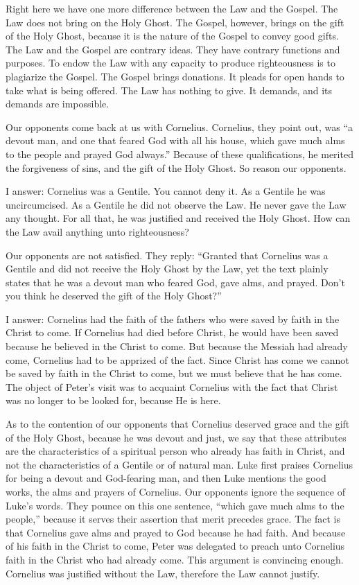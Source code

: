 Right here we have one more difference between the Law and the Gospel. The Law does not bring on the Holy Ghost. The Gospel, however, brings on the gift of the Holy Ghost, because it is the nature of the Gospel to convey good gifts. The Law and the Gospel are contrary ideas. They have contrary functions and purposes. To endow the Law with any capacity to produce righteousness is to plagiarize the Gospel. The Gospel brings donations. It pleads for open hands to take what is being offered. The Law has nothing to give. It demands, and its demands are impossible.

Our opponents come back at us with Cornelius. Cornelius, they point out, was “a devout man, and one that feared God with all his house, which gave much alms to the people and prayed God always.” Because of these qualifications, he merited the forgiveness of sins, and the gift of the Holy Ghost. So reason our opponents.

I answer: Cornelius was a Gentile. You cannot deny it. As a Gentile he was uncircumcised. As a Gentile he did not observe the Law. He never gave the Law any thought. For all that, he was justified and received the Holy Ghost. How can the Law avail anything unto righteousness?

Our opponents are not satisfied. They reply: “Granted that Cornelius was a Gentile and did not receive the Holy Ghost by the Law, yet the text plainly states that he was a devout man who feared God, gave alms, and prayed. Don’t you think he deserved the gift of the Holy Ghost?”

I answer: Cornelius had the faith of the fathers who were saved by faith in the Christ to come. If Cornelius had died before Christ, he would have been saved because he believed in the Christ to come. But because the Messiah had already come, Cornelius had to be apprized of the fact. Since Christ has come we cannot be saved by faith in the Christ to come, but we must believe that he has come. The object of Peter’s visit was to acquaint Cornelius with the fact that Christ was no longer to be looked for, because He is here.

As to the contention of our opponents that Cornelius deserved grace and the gift of the Holy Ghost, because he was devout and just, we say that these attributes are the characteristics of a spiritual person who already has faith in Christ, and not the characteristics of a Gentile or of natural man. Luke first praises Cornelius for being a devout and God-fearing man, and then Luke mentions the good works, the alms and prayers of Cornelius. Our opponents ignore the sequence of Luke’s words. They pounce on this one sentence, “which gave much alms to the people,” because it serves their assertion that merit precedes grace. The fact is that Cornelius gave alms and prayed to God because he had faith. And because of his faith in the Christ to come, Peter was delegated to preach unto Cornelius faith in the Christ who had already come. This argument is convincing enough. Cornelius was justified without the Law, therefore the Law cannot justify.


